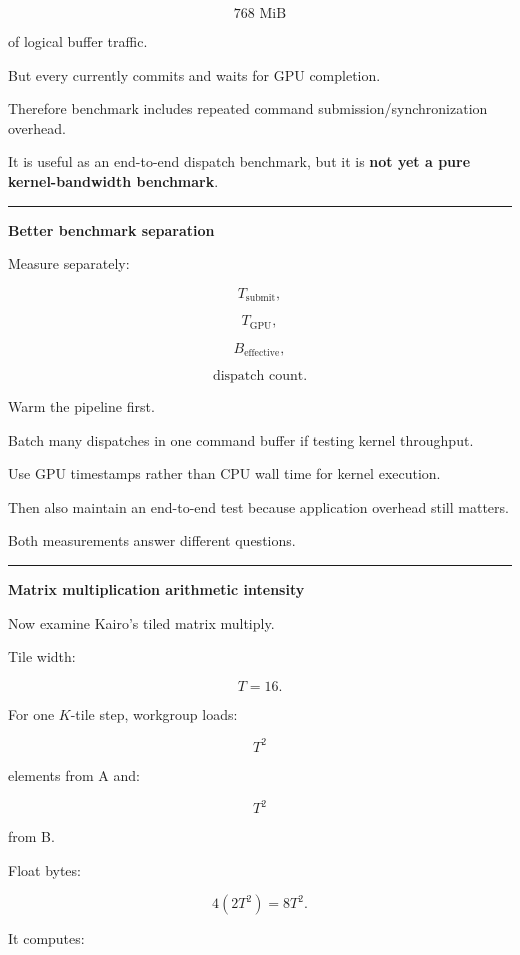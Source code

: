 \[
768\text{ MiB}
\]

of logical buffer traffic.

But every  currently commits and waits for GPU completion.

Therefore benchmark includes repeated command submission/synchronization overhead.

It is useful as an end-to-end dispatch benchmark, but it is \textbf{not yet a pure kernel-bandwidth benchmark}.

\begin{center}\rule{0.5\linewidth}{0.5pt}\end{center}

\textbf{Better benchmark separation}

Measure separately:

\[
T_{\text{submit}},
\]

\[
T_{\text{GPU}},
\]

\[
B_{\text{effective}},
\]

\[
\text{dispatch count}.
\]

Warm the pipeline first.

Batch many dispatches in one command buffer if testing kernel throughput.

Use GPU timestamps rather than CPU wall time for kernel execution.

Then also maintain an end-to-end test because application overhead still matters.

Both measurements answer different questions.

\begin{center}\rule{0.5\linewidth}{0.5pt}\end{center}

\textbf{Matrix multiplication arithmetic intensity}

Now examine Kairo's tiled matrix multiply.

Tile width:

\[
T=16.
\]

For one \(K\)-tile step, workgroup loads:

\[
T^2
\]

elements from A and:

\[
T^2
\]

from B.

Float bytes:

\[
4(2T^2)
=
8T^2.
\]

It computes:

